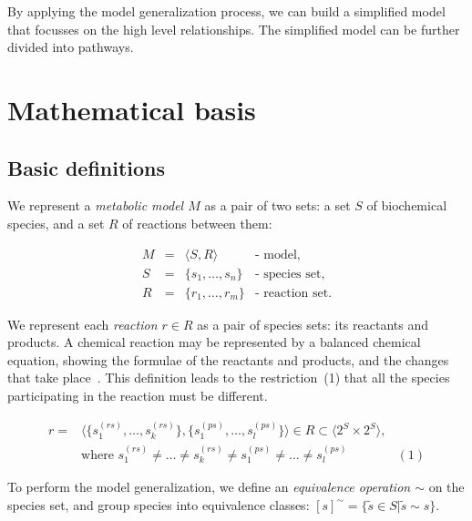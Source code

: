 \documentclass[9pt]{article}
\newcounter{def}
\newcounter{rm}
\begin{document}
By applying the model generalization process, we can build a simplified model that focusses on the high level relationships. The simplified model can be further divided into pathways. 

\newpage
\section*{Mathematical basis}

\subsection*{Basic definitions}

We represent a \emph{metabolic model $M$} as a pair of two sets: a set $S$ of biochemical species, and a set $R$ of reactions between them: 

\[ \begin{array}{ccll}
\mbox{$M$} & \mbox{$=$} & \mbox{$\langle S, R \rangle$} & \mbox{- model,} \\
\mbox{$S$} & \mbox{$=$} & \mbox{$\{s_1, \ldots, s_n\}$} &  \mbox{- species set,} \\
\mbox{$R$} & \mbox{$=$} & \mbox{$\{r_1, \ldots, r_m\}$} &  \mbox{- reaction set.} 
\end{array} \]

We represent each \emph{reaction $r \in R$} as a pair of species sets: its reactants and products. A chemical reaction may be represented by a balanced chemical equation, showing the formulae of the reactants and products, and the changes that take place~\citep{Clugston2000}. This definition leads to the restriction~(1) that all the species participating in the reaction must be different.

\[ \begin{array}{llr}
\mbox{$r = $} & \mbox{$\langle\{s^{(rs)}_1, \ldots, s^{(rs)}_k\},\{s^{(ps)}_1, \ldots, s^{(ps)}_l\}\rangle
\in R \subset \langle 2^S \times 2^S \rangle$}, &\\
& \mbox{where } \mbox{$s^{(rs)}_1 \neq \ldots \neq s^{(rs)}_k \neq s^{(ps)}_1 \neq \ldots \neq s^{(ps)}_l$}  & (1)
\end{array} \]

To perform the model generalization, we define an \emph{equivalence operation $\sim$} on the species set, and group species into equivalence classes: $[s]^{\sim} = \{\tilde{s} \in S | \tilde{s} \sim s\}$.
\end{document}
